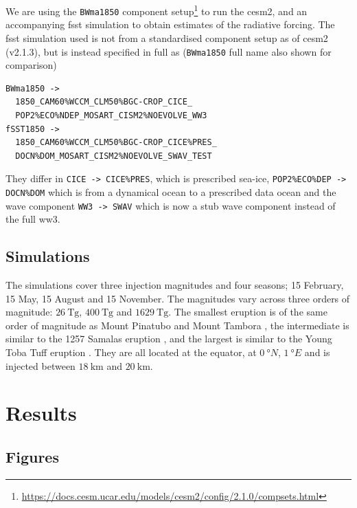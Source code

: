 \documentclass[twocol]{ametsocV5}
\begin{document}
We are using the \texttt{BWma1850} component
setup\footnote{\url{https://docs.cesm.ucar.edu/models/cesm2/config/2.1.0/compsets.html}}
to run the \acrshort{cesm2}, and an accompanying \acrfull{fsst} simulation to obtain
estimates of the radiative forcing. The \acrshort{fsst} simulation used is not from a
standardised component setup as of \acrshort{cesm2} (v2.1.3), but is instead specified
in full as (\texttt{BWma1850} full name also shown for comparison)
\begin{small}
  \begin{verbatim}
BWma1850 ->
  1850_CAM60%WCCM_CLM50%BGC-CROP_CICE_
  POP2%ECO%NDEP_MOSART_CISM2%NOEVOLVE_WW3
fSST1850 ->
  1850_CAM60%WCCM_CLM50%BGC-CROP_CICE%PRES_
  DOCN%DOM_MOSART_CISM2%NOEVOLVE_SWAV_TEST
  \end{verbatim}
\end{small}
They differ in \texttt{CICE -> CICE\%PRES}, which is prescribed sea-ice,
\texttt{POP2\%ECO\%DEP -> DOCN\%DOM} which is from a dynamical ocean to a prescribed
data ocean and the wave component \texttt{WW3 -> SWAV} which is now a stub wave
component instead of the full \acrfull{ww3}.

\subsection{Simulations}

The simulations cover three  injection magnitudes and four seasons; 15 February,
15 May, 15 August and 15 November. The magnitudes vary across three orders of magnitude:
\(\SI{26}{\tera\gram}\), \(\SI{400}{\tera\gram}\) and \(\SI{1629}{\tera\gram}\). The
smallest eruption is of the same order of magnitude as Mount Pinatubo
\citep[\(\sim10\)--\(\SI{20}{\tera\gram}\);~e.g.][]{timmreck2018} and Mount Tambora
\citep[\(\sim\SI{56.2}{\tera\gram}\);~e.g.][]{zanchettin2016}, the intermediate is
similar to the 1257 Samalas eruption
\citep[\(\sim\SI{119}{\tera\gram}\);][]{toohey2017}, and the largest is similar to the
Young Toba Tuff eruption
\citep[\(10\)--\(\SI{10000}{\tera\gram}\);][and~references~therein]{jones2005}. They are
all located at the equator, at \(\SI{0}{\degree N}\), \(\SI{1}{\degree E}\) and 
is injected between \(\SI{18}{\kilo\meter}\) and \(\SI{20}{\kilo\meter}\).

\section{Results}

\subsection{Figures}
\end{document}
